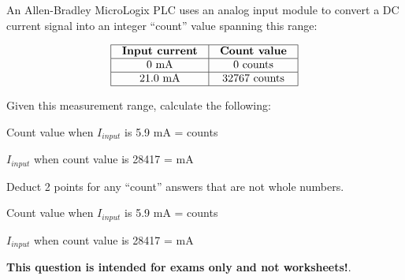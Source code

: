 

An Allen-Bradley MicroLogix PLC uses an analog input module to convert a DC current signal into an integer ``count'' value spanning this range:


$$\vbox{\offinterlineskip
\halign{\strut
\vrule \quad\hfil # \ \hfil & 
\vrule \quad\hfil # \ \hfil \vrule \cr
\noalign{\hrule}
%
{\bf Input current} & {\bf Count value} \cr
%
\noalign{\hrule}
%
0 mA & 0 counts \cr
%
\noalign{\hrule}
%
21.0 mA & 32767 counts \cr
%
\noalign{\hrule}
} %
}$$ %

Given this measurement range, calculate the following:

\vskip 30pt

\noindent
Count value when $I_{input}$ is 5.9 mA = \underbar{\hskip 50pt} counts

\vskip 30pt

\noindent
$I_{input}$ when count value is 28417 = \underbar{\hskip 50pt} mA

\vskip 20pt







Deduct 2 points for any ``count'' answers that are not whole numbers.

\vskip 10pt

\noindent
Count value when $I_{input}$ is 5.9 mA =  counts

\vskip 10pt

\noindent
$I_{input}$ when count value is 28417 =  mA







{\bf This question is intended for exams only and not worksheets!}.


